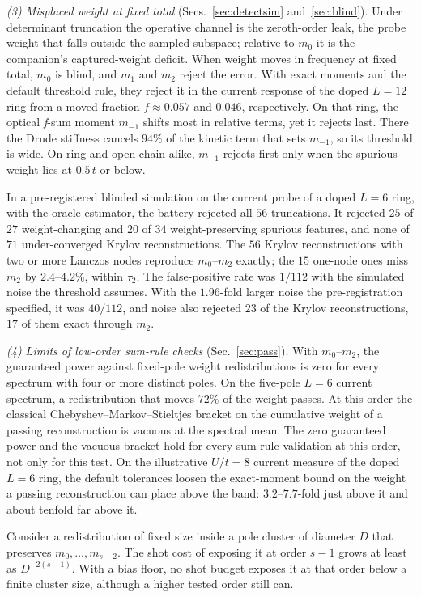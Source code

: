 \documentclass[submission, PhysCore]{SciPost}
\begin{document}
\emph{(3) Misplaced weight at fixed total} (Secs.~\ref{sec:detectsim} and~\ref{sec:blind}). Under determinant truncation the operative channel is the zeroth-order leak, the probe weight that falls outside the sampled subspace; relative to $m_0$ it is the companion's captured-weight deficit. When weight moves in frequency at fixed total, $m_0$ is blind, and $m_1$ and $m_2$ reject the error. With exact moments and the default threshold rule, they reject it in the current response of the doped $L=12$ ring from a moved fraction $f\approx0.057$ and $0.046$, respectively. On that ring, the optical \textit{f}-sum moment $m_{-1}$ shifts most in relative terms, yet it rejects last. There the Drude stiffness cancels $94\%$ of the kinetic term that sets $m_{-1}$, so its threshold is wide. On ring and open chain alike, $m_{-1}$ rejects first only when the spurious weight lies at $0.5\,t$ or below.

In a pre-registered blinded simulation on the current probe of a doped $L=6$ ring, with the oracle estimator, the battery rejected all $56$ truncations. It rejected $25$ of $27$ weight-changing and $20$ of $34$ weight-preserving spurious features, and none of $71$ under-converged Krylov reconstructions. The $56$ Krylov reconstructions with two or more Lanczos nodes reproduce $m_0$--$m_2$ exactly; the $15$ one-node ones miss $m_2$ by $2.4$--$4.2\%$, within $\tau_2$. The false-positive rate was $1/112$ with the simulated noise the threshold assumes. With the $1.96$-fold larger noise the pre-registration specified, it was $40/112$, and noise also rejected $23$ of the Krylov reconstructions, $17$ of them exact through $m_2$.

\emph{(4) Limits of low-order sum-rule checks} (Sec.~\ref{sec:pass}). With $m_0$--$m_2$, the guaranteed power against fixed-pole weight redistributions is zero for every spectrum with four or more distinct poles. On the five-pole $L=6$ current spectrum, a redistribution that moves $72\%$ of the weight passes. At this order the classical Chebyshev--Markov--Stieltjes bracket on the cumulative weight of a passing reconstruction is vacuous at the spectral mean. The zero guaranteed power and the vacuous bracket hold for every sum-rule validation at this order, not only for this test. On the illustrative $U/t=8$ current measure of the doped $L=6$ ring, the default tolerances loosen the exact-moment bound on the weight a passing reconstruction can place above the band: $3.2$--$7.7$-fold just above it and about tenfold far above it.

Consider a redistribution of fixed size inside a pole cluster of diameter $D$ that preserves $m_0,\dots,m_{s-2}$. The shot cost of exposing it at order $s-1$ grows at least as $D^{-2(s-1)}$. With a bias floor, no shot budget exposes it at that order below a finite cluster size, although a higher tested order still can.
\end{document}
